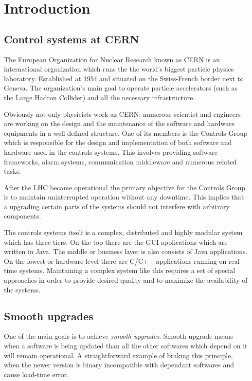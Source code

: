 \chapter{Introduction}


\section{Control systems at CERN}

The European Organization for Nuclear Research known as CERN is an international
organization which runs the the world's biggest particle physics laboratory.
Established at 1954 and situated on the Swiss-French border next to Geneva. The
organization's main goal to operate particle accelerators (such as the Large
Hadron Collider) and all the necessary infrastructure.

Obviously not only physicists work az CERN: numerous scientist and engineers are
working on the design and the maintenance of the software and hardware
equipments in a well-defined structure. One of its members is the Controls Group
which is responsible for the design and implementation of both software and
hardware used in the controls systems. This involves providing software
frameworks, alarm systems, communication middleware and numerous related tasks.

After the LHC became operational the  primary objective for the Controls Group
is to maintain uninterrupted operation without any downtime. This implies that a
upgrading certain parts of the systems should not interfere with arbitrary
components.

The controls systems itself is a complex, distributed and highly modular system
which has three tiers. On the top there are the GUI applications which are
written in Java. The middle or business layer is also consists of Java
applications. On the lowest or hardware level there are C/C++ applications
running on real-time systems. Maintaining a complex system like this requires a
set of special approaches in order to provide desired quality and to maximize
the availability of the systems.

\section{Smooth upgrades}
One of the main goals is to achieve \emph{smooth upgrades}. Smooth upgrade means
when a software is being updated than all the other softwares which depend on it
will remain operational. A straightforward example of braking this principle,
when the newer version is binary incompatible with dependant softwares and cause
load-time error.

